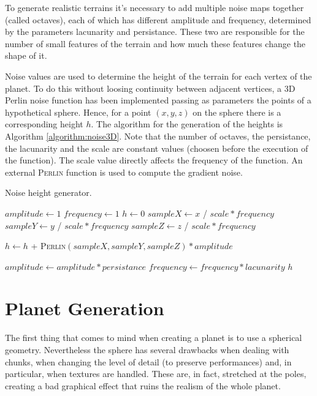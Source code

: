 \documentclass[paper=a4, fontsize=11pt]{scrartcl} %
\numberwithin{equation}{section} %
\numberwithin{figure}{section} %
\numberwithin{table}{section} %
\theoremstyle{definition}
\begin{document}
To generate realistic terrains it's necessary to add multiple noise maps
together (called octaves), each of which has different amplitude and frequency,
determined by the parameters lacunarity and persistance. These two are
responsible for the number of small features of the terrain and how much
these features change the shape of it.

Noise values are used to determine the height of the terrain for each vertex of
the planet. To do this without loosing continuity between adjacent vertices, a 3D
Perlin noise function has been implemented passing as parameters the points of
a hypothetical sphere. Hence, for a point $(x, y, z)$ on the sphere there is a
corresponding height $h$.
The algorithm for the generation of the heights is
Algorithm \ref{algorithm:noise3D}. Note that the number of octaves, the persistance,
the lacunarity and the scale are constant values (choosen before the execution
of the function). The scale value directly affects the frequency of the function.
An external \textsc{Perlin} function is used to compute the gradient noise.

\begin{algorithm}
	\caption{Noise height generator.}
	\label{algorithm:noise3D}
	\begin{algorithmic}[1]
			\State $amplitude \gets 1$
			\State $frequency \gets 1$
			\State $h \gets 0$
				\State $sampleX \gets x$ / $scale * frequency$
				\State $sampleY \gets y$ / $scale * frequency$
				\State $sampleZ \gets z$ / $scale * frequency$
				
				\State $h \gets h$ + \textsc{Perlin}$(sampleX, sampleY, sampleZ) * amplitude$
				
				\State $amplitude \gets amplitude * persistance$
				\State $frequency \gets frequency * lacunarity$
			\EndFor
			\State \Return $h$
		\EndFunction
	\end{algorithmic}
\end{algorithm}


\section{Planet Generation}

The first thing that comes to mind when creating a planet is to use a spherical
geometry. Nevertheless the sphere has several drawbacks when dealing with
chunks, when changing the level of detail (to preserve performances) and, in
particular, when textures are handled. These are, in fact, stretched at the poles,
creating a bad graphical effect that ruins the realism of the whole planet.
\end{document}
